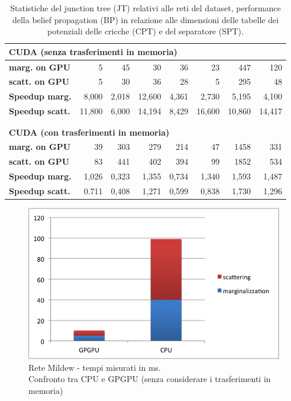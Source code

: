 \documentclass[a4paper]{article}   %
\begin{document}
\begin{table}
\begin{tabular}{ l | r | r | r | r | r | r | r }
\multicolumn{8}{l}{\textbf{CUDA (senza trasferimenti in memoria)}} \\
\hline
\textbf{marg. on GPU} &	5 &	45 &	30 &	36 &	23 &		447	& 120 \\
\hline
\textbf{scatt. on GPU} &	5 &	30 &	36 &	28 &	5	&	295 &	48 \\
\hline
\textbf{Speedup marg.} & 8,000 &	2,018 &	12,600 &	4,361 &	2,730	&	5,195 &	4,100 \\
\hline
\textbf{Speedup scatt.} & 11,800 &	6,000 &	14,194 &		8,429 &	16,600 &		10,860 &	14,417 \\
\multicolumn{8}{l}{ }	\\
\multicolumn{8}{l}{ }	\\								

\multicolumn{8}{l}{\textbf{CUDA (con trasferimenti in memoria)}} \\
\hline
\textbf{marg. on GPU} &	39 &	303	& 279 &	214 &	47 &		1458 &	331 \\
\hline
\textbf{scatt. on GPU} &	83	& 441 &	402	& 394 &	99 &		1852 &	534 \\
\hline
\textbf{Speedup marg.} & 1,026 & 0,323	  & 1,355	 & 0,734	 & 1,340	& 1,593	 & 1,487 \\
\hline
\textbf{Speedup scatt.} & 0.711 & 0,408 & 1,271	 & 0,599 & 0,838	& 1,730	 & 1,296	 \\
\end{tabular}
\caption{Statistiche del junction tree (JT) relativi alle reti del dataset, performance della belief propagation (BP) in relazione alle dimensioni delle tabelle dei potenziali delle cricche (CPT) e del separatore (SPT).}
\label{tab:tempi}
\end{table}

\begin{figure}[p]
\centering
\includegraphics[scale=0.8]{Mildew.png}
\caption{Rete Mildew - tempi misurati in ms.\\Confronto tra CPU e GPGPU (senza considerare i trasferimenti in memoria)} 
\label{graficoMildew}
\end{figure}
\end{document}
